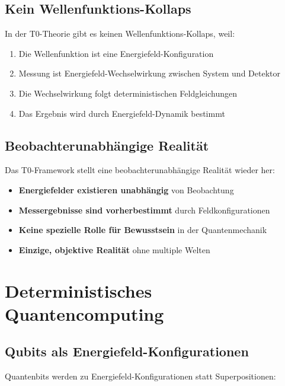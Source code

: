 \documentclass[12pt,a4paper]{report}
\begin{document}
\subsection{Kein Wellenfunktions-Kollaps}
\label{subsec:no_collapse}

In der T0-Theorie gibt es keinen Wellenfunktions-Kollaps, weil:

\begin{enumerate}
	\item Die Wellenfunktion ist eine Energiefeld-Konfiguration
	\item Messung ist Energiefeld-Wechselwirkung zwischen System und Detektor
	\item Die Wechselwirkung folgt deterministischen Feldgleichungen
	\item Das Ergebnis wird durch Energiefeld-Dynamik bestimmt
\end{enumerate}

\subsection{Beobachterunabhängige Realität}
\label{subsec:observer_independent_reality}

Das T0-Framework stellt eine beobachterunabhängige Realität wieder her:

\begin{itemize}
	\item \textbf{Energiefelder existieren unabhängig} von Beobachtung
	\item \textbf{Messergebnisse sind vorherbestimmt} durch Feldkonfigurationen
	\item \textbf{Keine spezielle Rolle für Bewusstsein} in der Quantenmechanik
	\item \textbf{Einzige, objektive Realität} ohne multiple Welten
\end{itemize}

\section{Deterministisches Quantencomputing}
\label{sec:deterministic_quantum_computing}

\subsection{Qubits als Energiefeld-Konfigurationen}
\label{subsec:qubits_energy_fields}

Quantenbits werden zu Energiefeld-Konfigurationen statt Superpositionen:
\end{document}
